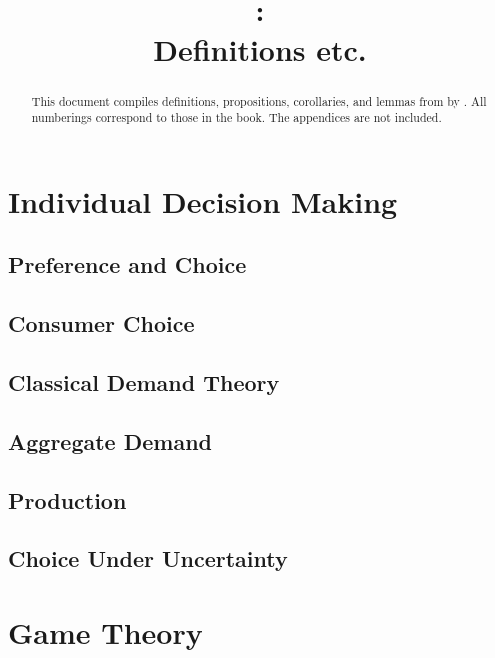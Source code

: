 \documentclass{report} %
\title{\citetitle{mas1995microeconomic}\\\parencite{mas1995microeconomic}:\\Definitions etc.}
\author{}
\date{}
\theoremstyle{definition}
\begin{document}
\maketitle

\begin{abstract}
	This document compiles definitions, propositions, corollaries, and lemmas from  by \cite{mas1995microeconomic}.
	All numberings correspond to those in the book.
	The appendices are not included.
\end{abstract}

\tableofcontents

\part{Individual Decision Making}

\chapter{Preference and Choice}


\chapter{Consumer Choice}


\chapter{Classical Demand Theory}


\chapter{Aggregate Demand}


\chapter{Production}


\chapter{Choice Under Uncertainty}



\part{Game Theory}
\end{document}
